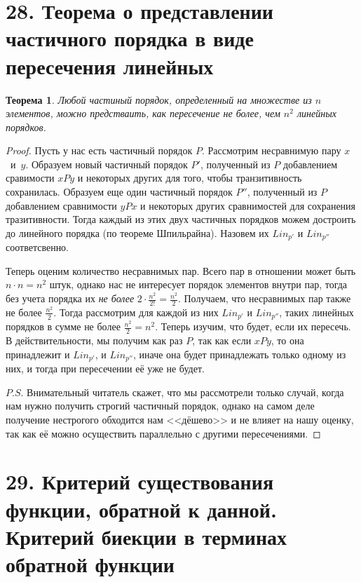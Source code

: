 \documentclass[a4paper,12pt]{article}
\newtheorem{Theorem}{Теорема}
\begin{document}
        \section*{28. Теорема о представлении частичного порядка в виде пересечения линейных}
        \begin{Theorem}
            Любой частиный порядок, определенный на множестве из $n$ элементов, можно предстваить, как пересечение не более, чем $n^2$ линейных порядков.
        \end{Theorem}

        \begin{proof}

            Пусть у нас есть частичный порядок $P$. Рассмотрим несравнимую пару $x$~и~$y$. Образуем новый частичный порядок $P'$, полученный из $P$ добавлением сравимости $xPy$
            и некоторых других для того, чтобы транзитивность сохранилась. Образуем еще один частичный порядок $P''$, полученный из $P$ добавлением сравнимости $yPx$ и некоторых
            других сравнимостей для сохранения тразитивности. Тогда каждый из этих двух частичных порядков можем достроить до линейного порядка (по теореме Шпильрайна).
            Назовем их $Lin_{p'}$ и $Lin_{p''}$ соответсвенно.

            Теперь оценим количество несравнимых пар. Всего пар в отношении может быть $n \cdot n = n^2$ штук, однако нас не интересует порядок элементов внутри пар,
            тогда без учета порядка их  \textit{не более} $2 \cdot \frac{n^2}{2!} = \frac{n^2}{2}$. Получаем, что несравнимых пар также не более $\frac{n^2}{2}$. Тогда рассмотрим для каждой из них
            $Lin_{p'}$ и $Lin_{p''}$, таких линейных порядков в сумме не более $\frac{n^2}{2} = n^2$. Теперь изучим, что будет, если их пересечь. В действительности, мы получим как раз $P$,
            так как если $xPy$, то она принадлежит и $Lin_{p'}$, и $Lin_{p''}$, иначе она будет принадлежать только одному из них, и тогда при пересечении её уже не будет.

            $P.S.$ Внимательный читатель скажет, что мы рассмотрели только случай, когда нам нужно получить строгий частичный порядок, однако на самом деле получение нестрогого
            обходится нам <<дёшево>> и не влияет на нашу оценку, так как её можно осуществить параллельно с другими пересечениями.


        \end{proof}

        \section*{29. Критерий существования функции, обратной к данной. Критерий биекции в терминах обратной функции}
\end{document}
